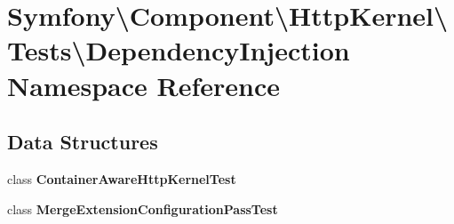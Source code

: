 \section{Symfony\textbackslash{}Component\textbackslash{}Http\+Kernel\textbackslash{}Tests\textbackslash{}Dependency\+Injection Namespace Reference}
\label{namespace_symfony_1_1_component_1_1_http_kernel_1_1_tests_1_1_dependency_injection}
\subsection*{Data Structures}
\begin{DoxyCompactItemize}
\item 
class {\bf Container\+Aware\+Http\+Kernel\+Test}
\item 
class {\bf Merge\+Extension\+Configuration\+Pass\+Test}
\end{DoxyCompactItemize}
